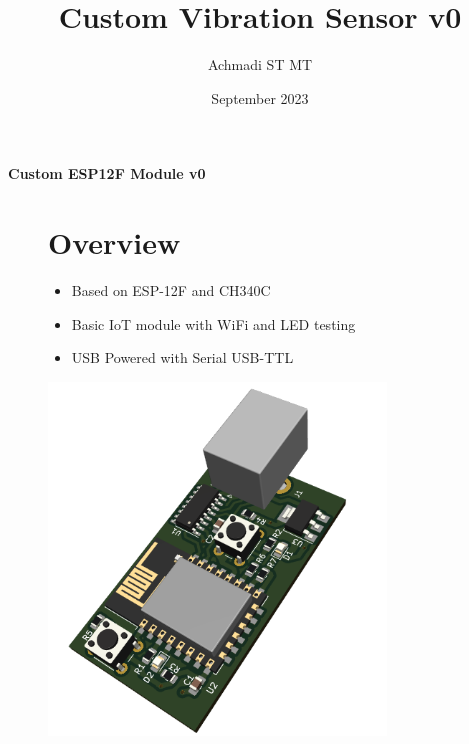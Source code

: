 \documentclass[a4paper,12pt,oneside,pdflatex,italian,final,twocolumn]{article}
\title{Custom Vibration Sensor v0}
\author{Achmadi ST MT}
\date{September 2023}
\begin{document}
	\pagestyle{fancy}

	\chead{\today}

	\onecolumn
	\begin{figure}

	\end{figure}\begin{minipage}{0.47\textwidth}
		\centering

	\end{minipage}
	\hfill
	\begin{minipage}{0.47\textwidth}
		\raggedleft
		\Huge \textbf{Custom ESP12F Module v0}
	\end{minipage}

\begin{figure}
	\begin{minipage}{0.47\textwidth}

		\section{Overview}
		\begin{itemize}
			\item Based on ESP-12F and CH340C
			\item Basic IoT module with WiFi and LED testing
			\item USB Powered with Serial USB-TTL
		\end{itemize}

		\end{minipage}
		\hfill
		\begin{minipage}{0.47\textwidth}
			\centering
			\includegraphics[width=0.8\textwidth,right]{images/perspective.png}
		\end{minipage}
	\end{figure}
\end{document}
